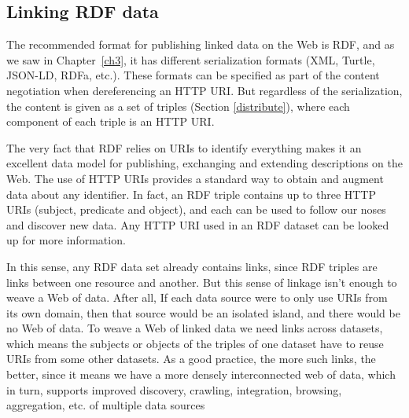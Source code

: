 \hypertarget{linking-rdf-data}{%
\subsection{Linking RDF data}\label{linking-rdf-data}}

The recommended format for publishing linked data on the Web is RDF,  and as we saw in Chapter~\ref{ch3}, it 
has different serialization formats (XML, Turtle,
JSON-LD, RDFa, etc.).  These formats can be specified as   part of the content negotiation when
dereferencing an HTTP URI.   But regardless of the serialization, the content is given as 
a set of triples (Section \ref{distribute}), where each component of each triple is an HTTP URI. 

The very fact that RDF relies on URIs to identify
everything makes it an excellent data model for publishing,
exchanging and extending descriptions on the Web. The use of HTTP URIs
provides a standard way to obtain and augment data about any 
identifier. In fact, an RDF triple contains up to three HTTP URIs
(subject, predicate and object), and each can be used to follow our
noses and discover new data. Any HTTP URI used in an RDF dataset
can be looked up for more information.

In this sense,   any RDF data set already contains links, since
RDF triples are links between one resource and another.  
But this sense of linkage isn't enough to weave a Web of data.  After all, 
If each data source were to only use  URIs from  its own domain, then
that source would be an isolated island,  and there would be no
Web of data.  To
weave a Web of linked data we need links across datasets,  which means the
subjects or objects of the triples of one dataset have to reuse
URIs from some other datasets.  As a good practice, the more such links, the better, 
since it means we have a more densely interconnected web of data, which in turn, supports
improved discovery,  crawling, integration, browsing,
aggregation, etc. of multiple data sources

